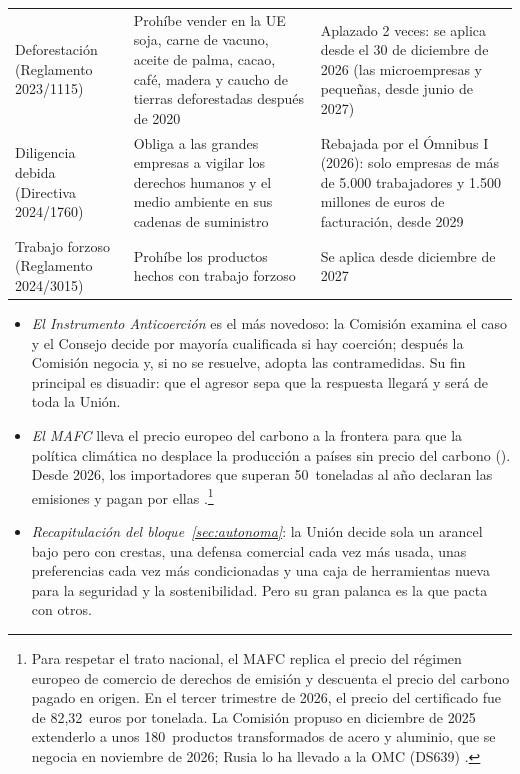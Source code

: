 \documentclass[11pt]{article}
\begin{document}
\begin{anotaciones}
\begin{tablacaja}
\begin{tabular}{>{\raggedright\arraybackslash}m{3.1cm}>{\raggedright\arraybackslash}m{5.4cm}>{\raggedright\arraybackslash}m{5.3cm}}
Deforestación (Reglamento 2023/1115) & Prohíbe vender en la UE soja, carne de vacuno, aceite de palma, cacao, café, madera y caucho de tierras deforestadas después de 2020 & Aplazado 2 veces: se aplica desde el 30 de diciembre de 2026 (las microempresas y pequeñas, desde junio de 2027)\\
Diligencia debida (Directiva 2024/1760) & Obliga a las grandes empresas a vigilar los derechos humanos y el medio ambiente en sus cadenas de suministro & Rebajada por el Ómnibus I (2026): solo empresas de más de 5.000 trabajadores y 1.500 millones de euros de facturación, desde 2029\\
Trabajo forzoso (Reglamento 2024/3015) & Prohíbe los productos hechos con trabajo forzoso & Se aplica desde diciembre de 2027\\
\bottomrule
\end{tabular}
\end{tablacaja}
\end{anotaciones}

\begin{itemize}
\item \emph{El Instrumento Anticoerción} es el más novedoso: la Comisión examina el caso y el Consejo decide por mayoría cualificada si hay coerción; después la Comisión negocia y, si no se resuelve, adopta las contramedidas. Su fin principal es disuadir: que el agresor sepa que la respuesta llegará y será de toda la Unión.
\item \emph{El MAFC} lleva el precio europeo del carbono a la frontera para que la política climática no desplace la producción a países sin precio del carbono (). Desde 2026, los importadores que superan 50~toneladas al año declaran las emisiones y pagan por ellas .\footnote{Para respetar el trato nacional, el MAFC replica el precio del régimen europeo de comercio de derechos de emisión y descuenta el precio del carbono pagado en origen. En el tercer trimestre de 2026, el precio del certificado fue de 82,32~euros por tonelada\nocite{CE2026PrecioCBAM}. La Comisión propuso en diciembre de 2025 extenderlo a unos 180~productos transformados de acero y aluminio, que se negocia en noviembre de 2026; Rusia lo ha llevado a la OMC (DS639) .}
\item \emph{Recapitulación del bloque~\ref{sec:autonoma}}: la Unión decide sola un arancel bajo pero con crestas, una defensa comercial cada vez más usada, unas preferencias cada vez más condicionadas y una caja de herramientas nueva para la seguridad y la sostenibilidad. Pero su gran palanca es la que pacta con otros.
\end{itemize}
\end{document}
